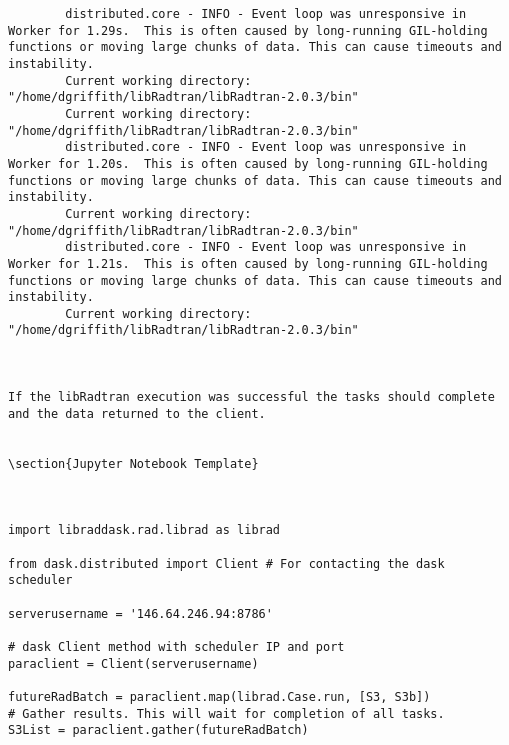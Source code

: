 \begin{lstlisting}
        distributed.core - INFO - Event loop was unresponsive in Worker for 1.29s.  This is often caused by long-running GIL-holding functions or moving large chunks of data. This can cause timeouts and instability.
        Current working directory: "/home/dgriffith/libRadtran/libRadtran-2.0.3/bin"
        Current working directory: "/home/dgriffith/libRadtran/libRadtran-2.0.3/bin"
        distributed.core - INFO - Event loop was unresponsive in Worker for 1.20s.  This is often caused by long-running GIL-holding functions or moving large chunks of data. This can cause timeouts and instability.
        Current working directory: "/home/dgriffith/libRadtran/libRadtran-2.0.3/bin"
        distributed.core - INFO - Event loop was unresponsive in Worker for 1.21s.  This is often caused by long-running GIL-holding functions or moving large chunks of data. This can cause timeouts and instability.
        Current working directory: "/home/dgriffith/libRadtran/libRadtran-2.0.3/bin"


        
If the libRadtran execution was successful the tasks should complete and the data returned to the client.


\section{Jupyter Notebook Template}



import libraddask.rad.librad as librad

from dask.distributed import Client # For contacting the dask scheduler

serverusername = '146.64.246.94:8786'

# dask Client method with scheduler IP and port
paraclient = Client(serverusername)

futureRadBatch = paraclient.map(librad.Case.run, [S3, S3b])
# Gather results. This will wait for completion of all tasks.
S3List = paraclient.gather(futureRadBatch)  
\end{lstlisting}
